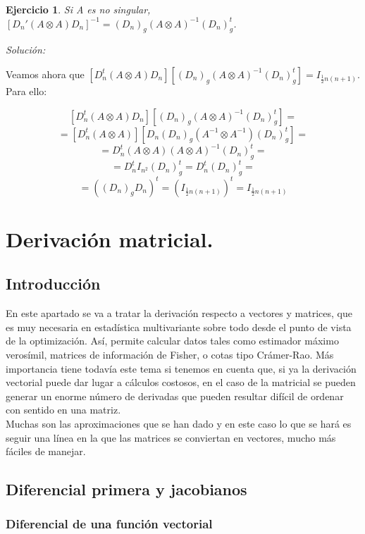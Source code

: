 \documentclass{article}
\theoremstyle{theorem-style}  %
\theoremstyle{definition-style}
\theoremstyle{example-style}
\theoremstyle{exercise-style}
\newtheorem{exercise}{Ejercicio}[section]
\begin{document}
	\begin{exercise}
		Si A es no singular, $[D_n'(A\otimes A)D_n]^{-1} = (D_n)_g(A\otimes A)^{-1}(D_n)^t_g$.
	\end{exercise}
	
	\textit{Solución:}
	
	Veamos ahora que $[D_n^t(A\otimes A)D_n][(D_n)_g(A\otimes A)^{-1}(D_n)^t_g] = I_{\frac{1}{2}n(n+1)}$. Para ello:
	
	$$ [D_n^t(A\otimes A)D_n][(D_n)_g(A\otimes A)^{-1}(D_n)^t_g] = $$
	$$ = [D_n^t(A\otimes A)][D_n(D_n)_g(A^{-1}\otimes A^{-1})(D_n)^t_g]= $$
	$$ = D_n^t(A\otimes A)(A\otimes A)^{-1}(D_n)^t_g = $$
	$$ = D_n^t I_{n^2}(D_n)_g^t = D_n^t(D_n)_g^t = $$ 
	$$= ((D_n)_gD_n)^t = (I_{\frac{1}{2}n(n+1)})^t = I_{\frac{1}{2}n(n+1)}$$ 
	
	\newpage	
	\section{Derivación matricial.}
	
	\subsection{Introducción}
	
	En este apartado se va a tratar la derivación respecto a vectores y matrices, que es muy necesaria en estadística multivariante sobre todo desde el punto de vista de la optimización. Así, permite calcular datos tales como estimador máximo verosímil, matrices de información de Fisher, o cotas tipo Crámer-Rao. Más importancia tiene todavía este tema si tenemos en cuenta que, si ya la derivación vectorial puede dar lugar a cálculos costosos, en el caso de la matricial se pueden generar un enorme número de derivadas que pueden resultar difícil de ordenar con sentido en una matriz. \\
	
	Muchas son las aproximaciones que se han dado y en este caso lo que se hará es seguir una línea en la que las matrices se conviertan en vectores, mucho más fáciles de manejar.
	
	\subsection{Diferencial primera y jacobianos}
	
	\subsubsection{Diferencial de una función vectorial}
	
\end{document}
